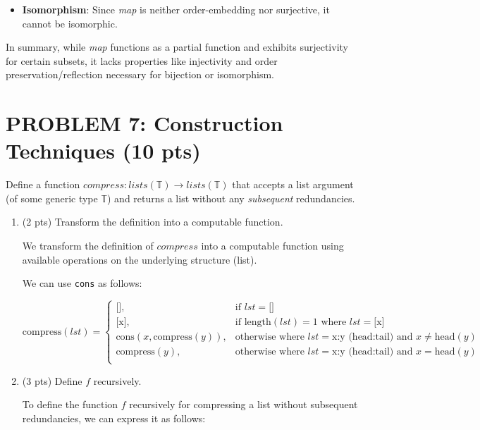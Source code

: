 \documentclass[12pt]{article}
\begin{document}
\begin{spacing}{1.5}
\begin{itemize}
		\item \textbf{Isomorphism}: Since \textit{map} is neither order-embedding nor surjective, it cannot be isomorphic.
	\end{itemize}
		
	\noindent In summary, while \textit{map} functions as a partial function and exhibits surjectivity for certain subsets, it lacks properties like injectivity and order preservation/reflection necessary for bijection or isomorphism.
			    
	\newpage
	\section*{PROBLEM 7: Construction Techniques (10 pts)}
		
	Define a function $compress : lists(\mathbb{T}) \rightarrow lists(\mathbb{T})$ that accepts a list argument (of some generic type $\mathbb{T}$) and returns a list without any \textit{subsequent} redundancies.
		
	\begin{enumerate}
		\item (2 pts) Transform the definition into a computable function.
		      		      
		      We transform the definition of $compress$ into a computable function using available operations on the underlying structure (list).
		      
		      We can use \texttt{cons} as follows:
		      
		      $$\text{compress}(lst) =\begin{cases}\text{[]}, & \text{if } lst = \text{[]} \\\text{[x]}, & \text{if } \text{length}(lst) = 1 \text{ where } lst = \text{[x]} \\\text{cons}(x, \text{compress}(y)), & \text{otherwise where } lst = \text{x:y} \text{ (head:tail) and } x \neq \text{head}(y) \\\text{compress}(y), & \text{otherwise where } lst = \text{x:y} \text{ (head:tail) and } x = \text{head}(y) \\\end{cases}$$
		      		
		\item (3 pts) Define $f$ recursively.
		      		      
		      To define the function $f$ recursively for compressing a list without subsequent redundancies, we can express it as follows: 
		      		      

\end{enumerate}
\end{spacing}
\end{document}
